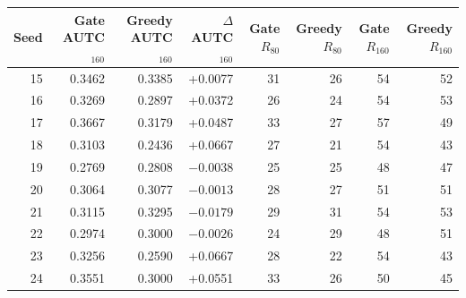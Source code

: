 \begin{tabular}{rrrrrrrr}
\toprule
Seed & Gate AUTC$_{160}$ & Greedy AUTC$_{160}$ & $\Delta$AUTC$_{160}$ & Gate $R_{80}$ & Greedy $R_{80}$ & Gate $R_{160}$ & Greedy $R_{160}$ \\
\midrule
15 & 0.3462 & 0.3385 & +0.0077 & 31 & 26 & 54 & 52 \\
16 & 0.3269 & 0.2897 & +0.0372 & 26 & 24 & 54 & 53 \\
17 & 0.3667 & 0.3179 & +0.0487 & 33 & 27 & 57 & 49 \\
18 & 0.3103 & 0.2436 & +0.0667 & 27 & 21 & 54 & 43 \\
19 & 0.2769 & 0.2808 & $-0.0038$ & 25 & 25 & 48 & 47 \\
20 & 0.3064 & 0.3077 & $-0.0013$ & 28 & 27 & 51 & 51 \\
21 & 0.3115 & 0.3295 & $-0.0179$ & 29 & 31 & 54 & 53 \\
22 & 0.2974 & 0.3000 & $-0.0026$ & 24 & 29 & 48 & 51 \\
23 & 0.3256 & 0.2590 & +0.0667 & 28 & 22 & 54 & 43 \\
24 & 0.3551 & 0.3000 & +0.0551 & 33 & 26 & 50 & 45 \\
\bottomrule
\end{tabular}
